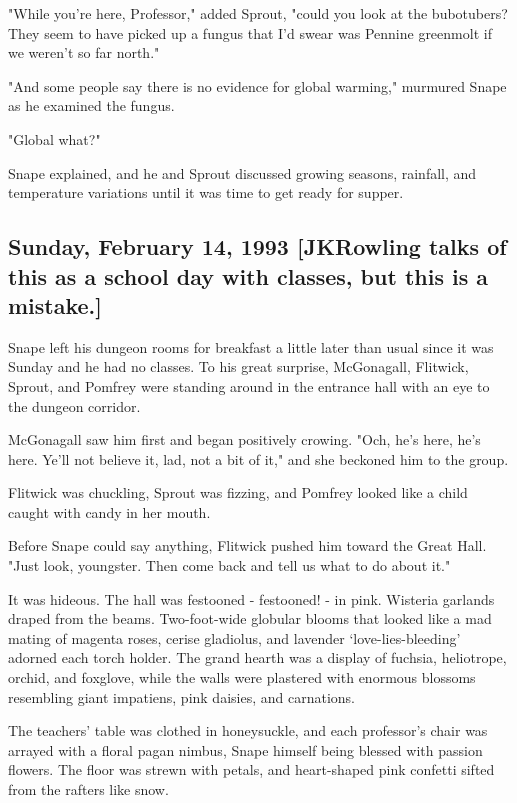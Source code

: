 "While you're here, Professor," added Sprout, "could you look at the bubotubers? They seem to have picked up a fungus that I'd swear was Pennine greenmolt if we weren't so far north."

"And some people say there is no evidence for global warming," murmured Snape as he examined the fungus.

"Global what?"

Snape explained, and he and Sprout discussed growing seasons, rainfall, and temperature variations until it was time to get ready for supper.

\sbreak

\subsection{Sunday, February 14, 1993 [JKRowling talks of this as a school day with classes, but this is a mistake.]}

Snape left his dungeon rooms for breakfast a little later than usual since it was Sunday and he had no classes. To his great surprise, McGonagall, Flitwick, Sprout, and Pomfrey were standing around in the entrance hall with an eye to the dungeon corridor.

McGonagall saw him first and began positively crowing. "Och, he's here, he's here. Ye'll not believe it, lad, not a bit of it," and she beckoned him to the group.

Flitwick was chuckling, Sprout was fizzing, and Pomfrey looked like a child caught with candy in her mouth.

Before Snape could say anything, Flitwick pushed him toward the Great Hall. "Just look, youngster. Then come back and tell us what to do about it."

It was hideous. The hall was festooned - festooned! - in pink. Wisteria garlands draped from the beams. Two-foot-wide globular blooms that looked like a mad mating of magenta roses, cerise gladiolus, and lavender `love-lies-bleeding' adorned each torch holder. The grand hearth was a display of fuchsia, heliotrope, orchid, and foxglove, while the walls were plastered with enormous blossoms resembling giant impatiens, pink daisies, and carnations.

The teachers' table was clothed in honeysuckle, and each professor's chair was arrayed with a floral pagan nimbus, Snape himself being blessed with passion flowers. The floor was strewn with petals, and heart-shaped pink confetti sifted from the rafters like snow.

